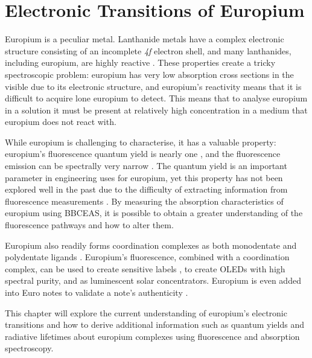 \chapter{Electronic Transitions of Europium}\label{ch:eu_theory}

Europium is a peculiar metal. Lanthanide metals have a complex
electronic structure consisting of an incomplete \textsl{4f} electron
shell, and many lanthanides, including europium, are highly reactive
\cite{Cooley:1946tv,Rard:1985tb}. These properties create a tricky
spectroscopic problem: europium has very low absorption cross sections in the
visible due to its electronic structure, and europium's reactivity means that
it is difficult to acquire lone europium to detect. This means that to analyse
europium in a solution it must be present at relatively high concentration in
a medium that europium does not react with.


While europium is challenging to characterise, it has a valuable
property: europium's fluorescence quantum yield is nearly one
\cite{Scotognella:2009jo,Moudam:2009in, Bunzli:2005ic}, and the fluorescence
emission can be spectrally very narrow \cite{Werts:2002fs}. The quantum yield
is an important parameter in engineering uses for europium, yet this property
has not been explored well in the past due to the difficulty of extracting
information from fluorescence measurements \cite{Werts:2002fs}. By measuring
the absorption characteristics of europium using \ac{BBCEAS}, it is possible to
obtain a greater understanding of the fluorescence pathways and how to alter
them.

Europium also readily forms coordination complexes as both monodentate and
polydentate ligands
\cite{Kirby:1983cl,Sveshnikova:2000cr,Werts:2002fs,Bunzli:2005ic,Scotognella:2009jo,Moudam:2009in}. Europium's fluorescence, combined with a coordination complex, can be used
to create sensitive labels
\cite{Harma:2010dm,Pihlasalo:2010el,InstituteofBiomedicine:2011vt,Pihlasalo:2011ju,Pihlasalo:2012cq,Pihlasalo:2012en},
to create OLEDs with high spectral purity\cite{Moudam:2009in}, and as
luminescent solar concentrators\cite{Moudam:2009in,Wilson:2010hs}. Europium is even added into Euro notes to validate a note's authenticity \cite{Suyver:2002ta}.

This chapter will explore the current understanding of europium's electronic
transitions and how to derive additional information such as quantum yields
and radiative lifetimes about europium complexes using fluorescence and
absorption spectroscopy.



